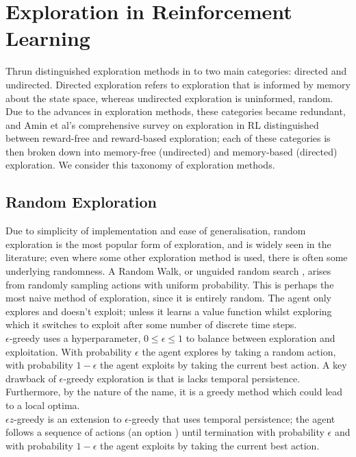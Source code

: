 \section{Exploration in Reinforcement Learning}
Thrun \cite{Thrun-1992-15850} distinguished exploration methods in to two main categories: directed and undirected. Directed exploration refers to exploration that is informed by memory about the state space, whereas undirected exploration is uninformed, random. Due to the advances in exploration methods, these categories became redundant, and Amin et al's \cite{DBLP:journals/corr/abs-2109-00157} comprehensive survey on exploration in RL distinguished between reward-free and reward-based exploration; each of these categories is then broken down into memory-free (undirected) and memory-based (directed) exploration. We consider this taxonomy of exploration methods.
\subsection{Random Exploration}
Due to simplicity of implementation and ease of generalisation, random exploration is the most popular form of exploration, and is widely seen in the literature; even where some other exploration method is used, there is often some underlying randomness.
A Random Walk, or unguided random search \cite{anderson86}, arises from randomly sampling actions with uniform probability. This is perhaps the most naive method of exploration, since it is entirely random. The agent only explores and doesn't exploit; unless it learns a value function whilst exploring which it switches to exploit after some number of discrete time steps.
\\$\epsilon$-greedy \cite{Watkins:1989, conf/nips/Sutton95} uses a hyperparameter, $0 \le \epsilon \le 1$ to balance between exploration and exploitation. With probability $\epsilon$ the agent explores by taking a random action, with probability $1-\epsilon$ the agent exploits by taking the current best action. A key drawback of $\epsilon$-greedy exploration is that is lacks temporal persistence. Furthermore, by the nature of the name, it is a greedy method which could lead to a local optima.
\\$\epsilon z$-greedy \cite{dabney2021temporallyextended} is an extension to $\epsilon$-greedy that uses temporal persistence; the agent follows a sequence of actions (an option \cite{SUTTON1999181}) until termination with probability $\epsilon$ and with probability $1-\epsilon$ the agent exploits by taking the current best action.
